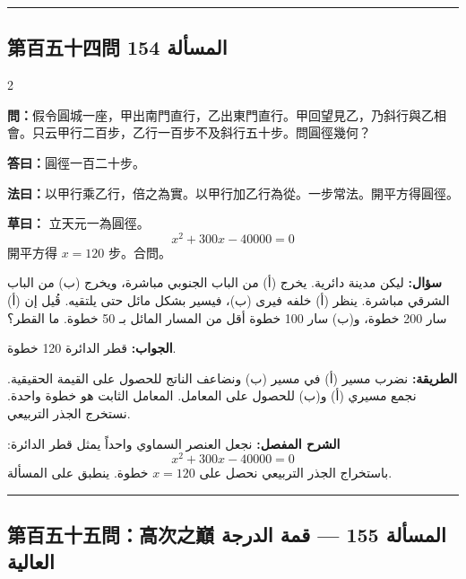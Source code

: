 \documentclass[11pt,a4paper]{article}
\newcommand{\ar}[1]{\arabicfont\beginR #1\endR}
\newcommand{\arb}[1]{\textbf{\arabicfont\beginR #1\endR}}
\newcommand{\longline}{\noindent\rule{\textwidth}{0.4pt}}
\newcommand{\arnote}[1]{\textcolor{arabicblue}{\ar{#1}}}
\newcommand{\wen}[1]{\par\noindent\textbf{\textcolor{probcolor}{問：}}{#1}\par}
\newcommand{\da}[1]{\par\noindent\textbf{\textcolor{anscolor}{答曰：}}{#1}\par}
\newcommand{\fayue}[1]{\par\noindent\textbf{\textcolor{methodcolor}{法曰：}}{#1}\par}
\newcommand{\caoyue}[1]{\par\noindent\textbf{草曰：}{#1}\par}
\newcommand{\arwen}[1]{\par\noindent\arb{سؤال: }\arnote{#1}\par}
\newcommand{\arjwb}[1]{\par\noindent\arb{الجواب: }\arnote{#1}\par}
\newcommand{\arqwd}[1]{\par\noindent\arb{الطريقة: }\arnote{#1}\par}
\newcommand{\arshr}[1]{\par\noindent\arb{الشرح المفصل: }\arnote{#1}\par}
\begin{document}
\vspace{0.3cm}
\longline

\subsection*{第百五十四問 \hfill \ar{المسألة 154}}

\begin{paracol}{2}

\begin{leftcolumn}
\wen{假令圓城一座，甲出南門直行，乙出東門直行。甲回望見乙，乃斜行與乙相會。只云甲行二百步，乙行一百步不及斜行五十步。問圓徑幾何？}

\da{圓徑一百二十步。}

\fayue{以甲行乘乙行，倍之為實。以甲行加乙行為從。一步常法。開平方得圓徑。}

\caoyue{
立天元一為圓徑。
$$x^2 + 300x - 40000 = 0$$
開平方得 $x = 120$ 步。合問。}
\end{leftcolumn}

\begin{rightcolumn}
\arwen{ليكن مدينة دائرية. يخرج (أ) من الباب الجنوبي مباشرة، ويخرج (ب) من الباب الشرقي مباشرة. ينظر (أ) خلفه فيرى (ب)، فيسير بشكل مائل حتى يلتقيه. قُيل إن (أ) سار 200 خطوة، و(ب) سار 100 خطوة أقل من المسار المائل بـ 50 خطوة. ما القطر؟}

\arjwb{قطر الدائرة 120 خطوة.}

\arqwd{نضرب مسير (أ) في مسير (ب) ونضاعف الناتج للحصول على القيمة الحقيقية. نجمع مسيري (أ) و(ب) للحصول على المعامل. المعامل الثابت هو خطوة واحدة. نستخرج الجذر التربيعي.}

\arshr{نجعل العنصر السماوي واحداً يمثل قطر الدائرة:
$$x^2 + 300x - 40000 = 0$$
باستخراج الجذر التربيعي نحصل على $x = 120$ خطوة. ينطبق على المسألة.}
\end{rightcolumn}

\end{paracol}

\vspace{0.3cm}
\longline

\subsection*{第百五十五問：高次之巔 \hfill \ar{المسألة 155 — قمة الدرجة العالية}}
\end{document}
